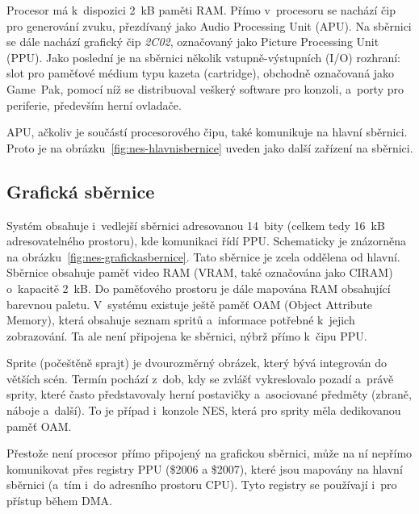 Procesor má k~dispozici 2~kB paměti RAM. Přímo v~procesoru se nachází čip pro generování zvuku, přezdívaný jako Audio Processing Unit (APU).  Na sběrnici se dále nachází grafický čip \emph{2C02}, označovaný jako Picture Processing Unit (PPU). Jako poslední je na sběrnici několik vstupně-výstupních (I/O) rozhraní: slot pro paměťové médium typu kazeta (cartridge), obchodně označovaná jako Game~Pak, pomocí níž se distribuoval veškerý software pro konzoli, a~porty pro periferie, především herní ovladače.

\begin{note}
	APU, ačkoliv je součástí procesorového čipu, také komunikuje na hlavní sběrnici. Proto je na obrázku~\ref{fig:nes-hlavnisbernice} uveden jako další zařízení na sběrnici.
\end{note}

\subsection{Grafická sběrnice}
Systém obsahuje i~vedlejší sběrnici adresovanou 14~bity (celkem tedy 16~kB adresovatelného prostoru), kde komunikaci řídí PPU. Schematicky je znázorněna na obrázku~\ref{fig:nes-grafickasbernice}. Tato sběrnice je zcela oddělena od hlavní. Sběrnice obsahuje paměť video RAM (VRAM, také označována jako CIRAM) o~kapacitě 2~kB. Do paměťového prostoru je dále mapována RAM obsahující barevnou paletu. V~systému existuje ještě paměť OAM (Object Attribute Memory), která obsahuje seznam spritů a~informace potřebné k~jejich zobrazování. Ta ale není připojena ke sběrnici, nýbrž přímo k~čipu PPU.

\begin{definition}[Sprite]
	Sprite (počeštěně sprajt) je dvourozměrný obrázek, který bývá integrován do větších scén. Termín pochází z~dob, kdy se zvlášť vykreslovalo pozadí a~právě sprity, které často představovaly herní postavičky a~asociované předměty (zbraně, náboje a~další). To je případ i~konzole NES, která pro sprity měla dedikovanou paměť OAM.
\end{definition}

\begin{note}
	Přestože není procesor přímo připojený na grafickou sběrnici, může na ní nepřímo komunikovat přes registry PPU (\$2006 a \$2007), které jsou mapovány na hlavní sběrnici (a~tím i~do adresního prostoru CPU). Tyto registry se používají i~pro přístup během DMA.
\end{note}

